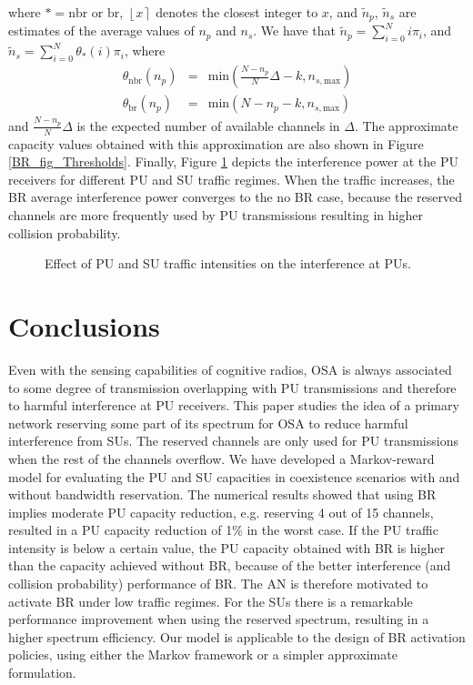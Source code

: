 where $\ast = \text{nbr}$ or $\text{br}$, $\left\lfloor x\right\rceil$ denotes the closest integer to $x$, and $\tilde{n}_{p}$, $\tilde{n}_{s}$ are estimates of the average values of $n_{p}$ and $n_{s}$. We have that $\tilde{n}_{p} = \sum_{i=0}^{N}i\pi_{i}$, and $\tilde{n}_{s} = \sum_{i=0}^{N}\theta_{\ast}(i)\pi_{i}$, where
\begin{equation}
\begin{array}{lcl}
\theta_{\text{nbr}}(n_{p}) & = & \text{min}\left(\frac{N-n_{p}}{N}\Delta-k,n_{s,\text{max}}\right)\\
\theta_{\text{br}}(n_{p}) & = & \text{min}\left(N-n_{p}-k,n_{s,\text{max}}\right)
\end{array}
\end{equation}
and $\frac{N-n_{p}}{N}\Delta$ is the expected number of available channels in $\Delta$. 
The approximate capacity values obtained with this approximation are also shown in Figure \ref{BR_fig_Thresholds}.
Finally, Figure \ref{BR_fig_sim_interference} depicts the interference power at the PU receivers for different PU and SU traffic regimes. When the traffic increases, the BR average interference power converges to the no BR case, because the reserved channels are more frequently used by PU transmissions resulting in higher collision probability.
\begin{figure}[ht]
\begin{center}
\resizebox{9cm}{!}{}
\end{center}
\caption{Effect of PU and SU traffic intensities on the interference at PUs.}\label{BR_fig_sim_interference}
\end{figure}

\section{Conclusions}\label{sec:Conclusion}
Even with the sensing capabilities of cognitive radios, OSA is always associated to some degree of transmission overlapping with PU transmissions and therefore to harmful interference at PU receivers. 
This paper studies the idea of a primary network reserving some part of its spectrum for OSA to reduce harmful interference from SUs. 
The reserved channels are only used for PU transmissions when the rest of the channels overflow.
We have developed a Markov-reward model for evaluating the PU and SU capacities in coexistence scenarios with and without bandwidth reservation.
The numerical results showed that using BR implies moderate PU capacity reduction, e.g. reserving 4 out of 15 channels, resulted in a PU capacity reduction of 1\% in the worst case. If the PU traffic intensity is below a certain value, the PU capacity obtained with BR is higher than the capacity achieved without BR, because of the better interference (and collision probability) performance of BR.  
The AN is therefore motivated to activate BR under low traffic regimes. For the SUs there is a remarkable performance improvement when using the reserved spectrum, resulting in a higher spectrum efficiency.
Our model is applicable to the design of BR activation policies, using either the Markov framework or a simpler approximate formulation.